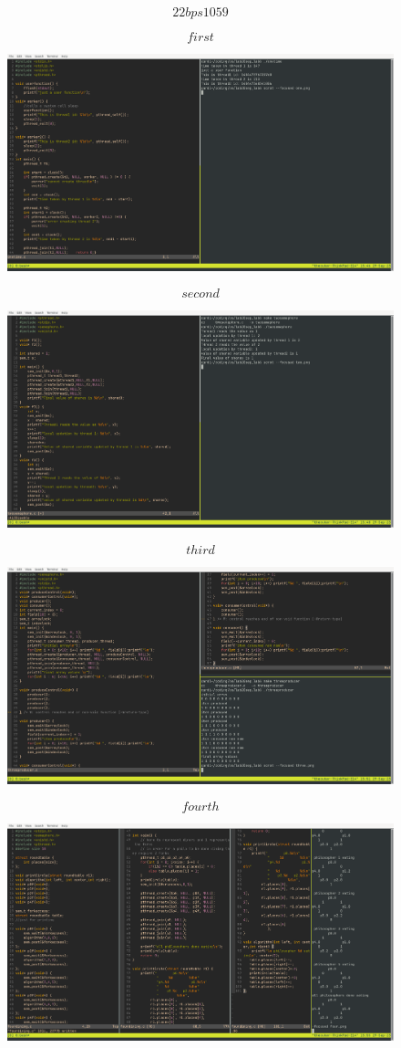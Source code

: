 \documentclass{article}
\begin{document}
$$22bps1059$$

\begin{figure}[htbp]
    $$first$$
    \centerline{ \includegraphics[width=1.5\linewidth]{one.png} }
    $$second$$
    \centerline{ \includegraphics[width=1.5\linewidth]{two.png} }
\end{figure}

\begin{figure}[htbp]
    $$third$$
    \centerline{ \includegraphics[width=1.5\linewidth]{three.png} }
    $$fourth$$
    \centerline{ \includegraphics[width=1.5\linewidth]{four.png} }
\end{figure}
\end{document}
